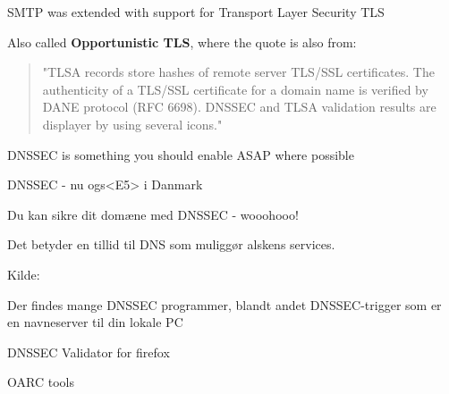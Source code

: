 \documentclass[Screen16to9,17pt]{foils}
\begin{document}
\begin{list1}
\item SMTP was extended with support for Transport Layer Security TLS
\item Also called {\bf Opportunistic TLS}, where the quote is also from:\\ 
\end{list1}





\begin{quote}
"TLSA records store hashes of remote server TLS/SSL certificates. The authenticity of a TLS/SSL certificate for a domain name is verified by DANE protocol (RFC 6698). DNSSEC and TLSA validation results are displayer by using several icons."
\end{quote}

DNSSEC is something you should enable ASAP where possible



\centerline{DNSSEC - nu ogs<E5> i Danmark}

Du kan sikre dit domæne med DNSSEC - wooohooo!

Det betyder en tillid til DNS som muliggør alskens services.

Kilde:\\




Der findes mange DNSSEC programmer, blandt andet DNSSEC-trigger som er en navneserver til din lokale PC

\begin{list2}
\item DNSSEC Validator for firefox\\ 
\item OARC tools 
\item {}
\end{list2}
\end{document}
